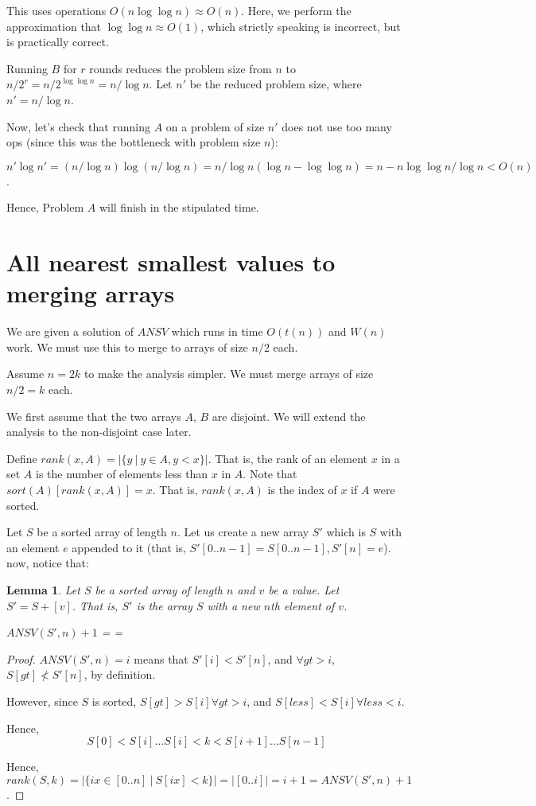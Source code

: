 \documentclass{article}
\newtheorem{lemma}{Lemma}
\begin{document}
This uses operations $O(n \log \log n) \approx O(n)$. Here, we perform
the approximation that $\log \log n \approx O(1)$, which strictly speaking
is incorrect, but is practically correct.

Running $B$ for $r$ rounds reduces the problem size from $n$ to
$n / 2^r = n / 2^{\log \log n} = n / \log n$. Let $n'$ be the
reduced problem size, where $n' = n / \log n$.


Now, let's check that running $A$ on a problem of size $n'$ does not use
too many ops (since this was the bottleneck with problem size $n$):


$n' \log n' = (n / \log n) \log (n / \log n) = n / \log n (\log n - \log \log n) = n - n \log \log n / \log n < O(n)$.


Hence, Problem $A$ will finish in the stipulated time.

\section{All nearest smallest values to merging arrays}
We are given a solution of $ANSV$ which runs in time $O(t(n))$ and $W(n)$ work.
We must use this to merge to arrays of size $n / 2$ each.

Assume $n = 2k$ to make the analysis simpler. We must merge arrays
of size $n/ 2 = k$ each.

We first assume that the two arrays $A$, $B$ are disjoint. We will extend the
analysis to the non-disjoint case later.

Define $rank(x, A) = |\{y~\vert~y \in A, y < x \}|$. That is, the rank
of an element $x$ in a set $A$ is the number of elements less than $x$ in $A$.
Note that $sort(A)[rank(x, A)] = x$. That is, $rank(x, A)$ is the index of
$x$ if $A$ were sorted. 

Let $S$ be a sorted array of length $n$. Let us create a new array $S'$ which
 is $S$ with an element $e$ appended to it (that is, $S'[0..n-1] = S[0..n-1],
 S'[n] = e$). now, notice that:
 
 \begin{lemma}
     Let $S$ be a sorted array of length $n$ and $v$ be a value. Let $S' = S + [v]$. That is,
     $S'$ is the array $S$ with a new $n$th element of $v$.


     $ANSV(S', n) + 1 $ =  = 
 \end{lemma}
 \begin{proof}
     $ANSV(S', n) = i$ means that $S'[i] < S'[n]$, and $\forall gt > i$, 
     $S[gt] \not < S'[n]$, by definition.
     
     However, since $S$ is sorted, $S[gt] > S[i] \forall gt > i$,
     and $S[less] < S[i] \forall less < i$.

     Hence, $$S[0] < S[i] \dots S[i] < k < S[i + 1] \dots S[n - 1]$$

     Hence, $rank(S, k) = |\{ ix \in [0..n]~\vert~S[ix] < k \}| = |[0..i]| = i + 1 = ANSV(S', n) + 1$.

 \end{proof}
\end{document}
